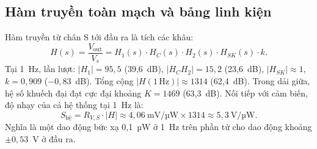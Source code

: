 \subsection{Hàm truyền toàn mạch và bảng linh kiện}
\label{sec:toanmach}

Hàm truyền từ chân S tới đầu ra là tích các khâu:
\begin{equation}
  H(s) = \frac{V_\text{out}}{V_s} = H_1(s)\cdot H_C(s)\cdot H_2(s)\cdot H_{SK}(s)\cdot k .
  \label{eq:Htong}
\end{equation}
Tại 1~Hz, lần lượt: $|H_1| = 95{,}5$ (39,6~dB), $|H_C H_2| = 15{,}2$ (23,6~dB), $|H_{SK}| \approx 1$, $k = 0{,}909$ ($-0{,}83$~dB). Tổng cộng $|H(1\,\text{Hz})| \approx 1314$ (62,4~dB). Trong dải giữa, hệ số khuếch đại đạt cực đại khoảng $K = 1469$ (63,3~dB). Nối tiếp với cảm biến, độ nhạy của cả hệ thống tại 1~Hz là:
\begin{equation}
  S_\text{hệ} = R_{V,S}\cdot|H| \approx 4{,}06~\text{mV/µW} \times 1314 \approx 5{,}3~\text{V/µW}.
  \label{eq:Shethong}
\end{equation}
Nghĩa là một dao động bức xạ 0,1~µW ở 1~Hz trên phần tử cho dao động khoảng $\pm 0{,}53$~V ở đầu ra.

